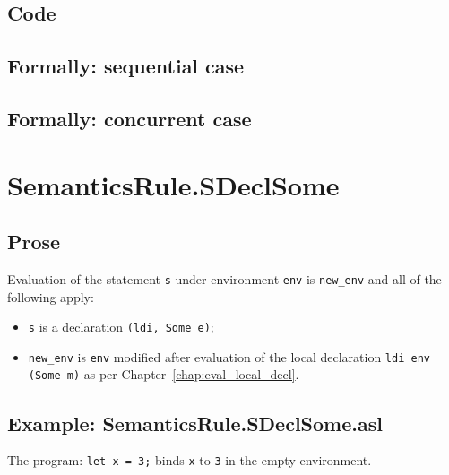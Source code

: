 \documentclass{book}
\begin{document}
  \subsection{Code}

\begin{emptyformal}
  \subsection{Formally: sequential case}

  \subsection{Formally: concurrent case}
\end{emptyformal}


\section{SemanticsRule.SDeclSome \label{sec:SemanticsRule.SDeclSome}}

    \subsection{Prose}
  Evaluation of the statement \texttt{s} under environment \texttt{env} is
\texttt{new\_env} and all of the following apply:
    \begin{itemize}
    \item \texttt{s} is a declaration \texttt{(ldi, Some e)};
    \item \texttt{new\_env} is \texttt{env} modified after evaluation of the local declaration
      \texttt{ldi env (Some m)} as per Chapter~\ref{chap:eval_local_decl}.
    \end{itemize}

    \subsection{Example: SemanticsRule.SDeclSome.asl}
    The program:
    \texttt{let x = 3;} binds \texttt{x} to \texttt{3} in the empty environment.
\end{document}
